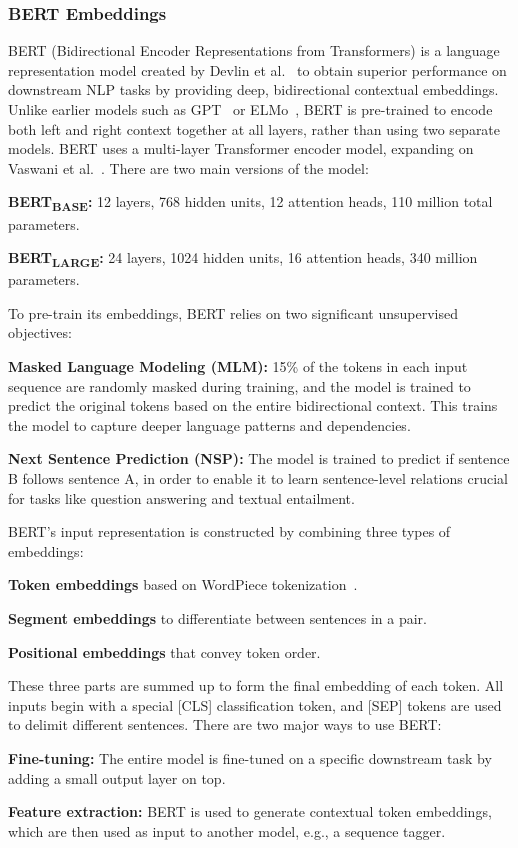 \subsubsection{BERT Embeddings}
BERT (Bidirectional Encoder Representations from Transformers) is a language representation model created by Devlin et al.~\cite{2019-bert} to obtain superior performance on downstream NLP tasks by providing deep, bidirectional contextual embeddings. Unlike earlier models such as GPT~\cite{gpt-2018} or ELMo~\cite{elmo}, BERT is pre-trained to encode both left and right context together at all layers, rather than using two separate models.
BERT uses a multi-layer Transformer encoder model, expanding on Vaswani et al.~\cite{attention-2017}. There are two main versions of the model:
\begin{compactitem}
\item\textbf{BERT\textsubscript{BASE}:} 12 layers, 768 hidden units, 12 attention heads, 110 million total parameters.
\item \textbf{BERT\textsubscript{LARGE}:} 24 layers, 1024 hidden units, 16 attention heads, 340 million parameters.
\end{compactitem}
To pre-train its embeddings, BERT relies on two significant unsupervised objectives:
\begin{compactitem}
\item \textbf{Masked Language Modeling (MLM):} 15\% of the tokens in each input sequence are randomly masked during training, and the model is trained to predict the original tokens based on the entire bidirectional context. This trains the model to capture deeper language patterns and dependencies.
\item \textbf{Next Sentence Prediction (NSP):} The model is trained to predict if sentence B follows sentence A, in order to enable it to learn sentence-level relations crucial for tasks like question answering and textual entailment.
\end{compactitem}
BERT's input representation is constructed by combining three types of embeddings:
\begin{compactitem}
\item \textbf{Token embeddings} based on WordPiece tokenization~\cite{wordpiece}.
\item \textbf{Segment embeddings} to differentiate between sentences in a pair.
\item \textbf{Positional embeddings} that convey token order.
\end{compactitem}
These three parts are summed up to form the final embedding of each token. All inputs begin with a special [CLS] classification token, and [SEP] tokens are used to delimit different sentences.
There are two major ways to use BERT:
\begin{compactitem}
\item \textbf{Fine-tuning:} The entire model is fine-tuned on a specific downstream task by adding a small output layer on top.
\item \textbf{Feature extraction:} BERT is used to generate contextual token embeddings, which are then used as input to another model, e.g., a sequence tagger.
\end{compactitem}

